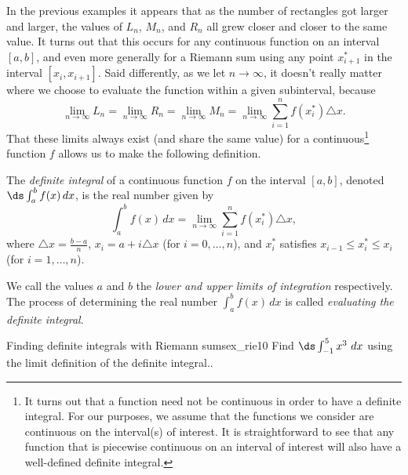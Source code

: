 In the previous examples it appears that as the number of rectangles got larger and larger, the values of $L_n$, $M_n$, and $R_n$ all grew closer and closer to the same value.  It turns out that this occurs for any continuous function on an interval $[a,b]$, and even more generally for a Riemann sum using any point $x_{i+1}^*$ in the interval $[x_i, x_{i+1}]$.  Said differently, as we let $n \to \infty$, it doesn't really matter where we choose to evaluate the function within a given subinterval, because
$$\lim_{n \to \infty} L_n = \lim_{n \to \infty} R_n = \lim_{n \to \infty} M_n = \lim_{n \to \infty} \sum_{i=1}^{n} f(x_i^*) \triangle x.$$  
That these limits always exist (and share the same value) for a continuous\footnote{It turns out that a function need not be continuous in order to have a definite integral.  For our purposes, we assume that the functions we consider are continuous on the interval(s) of interest.  It is straightforward to see that any function that is piecewise continuous on an interval of interest will also have a well-defined definite integral.} function $f$ allows us to make the following definition.
\begin{definition} \label{D:4.3.DefInt}
The \emph{definite integral} of a continuous function $f$ on the interval $[a,b]$, denoted $\ds \int_a^b f(x) \, dx$, is the real number given by
$$\int_a^b f(x) \, dx = \lim_{n \to \infty} \sum_{i=1}^{n} f(x_i^*) \triangle x,$$
where $\triangle x = \frac{b-a}{n}$, $x_i = a + i\triangle x$ (for $i = 0, \ldots, n$), and $x_i^*$ satisfies $x_{i-1} \le x_i^* \le x_i$ (for $i = 1, \ldots, n$).
\end{definition}
We call the values $a$ and $b$ the \emph{lower and upper limits of integration} respectively.  The process of determining the real number $\int_a^b f(x) \, dx$ is called \emph{evaluating the definite integral}.  

\begin{example}{Finding definite integrals with Riemann sums}{ex_rie10}
{
Find  $\ds \int_{-1}^5 x^3\ dx$ using the limit definition of the definite integral..
}
\end{example}

